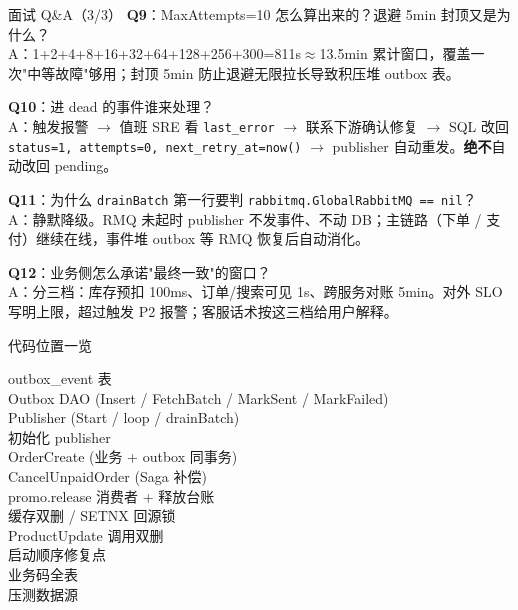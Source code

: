 \documentclass[aspectratio=169,11pt]{beamer}
\begin{document}
\begin{frame}[shrink]{面试 Q\&A（3/3）}
\textbf{Q9}：MaxAttempts=10 怎么算出来的？退避 5min 封顶又是为什么？\\
\hspace{4mm}\small A：1+2+4+8+16+32+64+128+256+300=811s$\approx$13.5min 累计窗口，覆盖一次"中等故障"够用；封顶 5min 防止退避无限拉长导致积压堆 outbox 表。

\vspace{2mm}
\textbf{Q10}：进 dead 的事件谁来处理？\\
\hspace{4mm}\small A：触发报警 $\to$ 值班 SRE 看 \texttt{last\_error} $\to$ 联系下游确认修复 $\to$ SQL 改回 \texttt{status=1, attempts=0, next\_retry\_at=now()} $\to$ publisher 自动重发。\textbf{绝不}自动改回 pending。

\vspace{2mm}
\textbf{Q11}：为什么 \texttt{drainBatch} 第一行要判 \texttt{rabbitmq.GlobalRabbitMQ == nil}？\\
\hspace{4mm}\small A：静默降级。RMQ 未起时 publisher 不发事件、不动 DB；主链路（下单 / 支付）继续在线，事件堆 outbox 等 RMQ 恢复后自动消化。

\vspace{2mm}
\textbf{Q12}：业务侧怎么承诺"最终一致"的窗口？\\
\hspace{4mm}\small A：分三档：库存预扣 100ms、订单/搜索可见 1s、跨服务对账 5min。对外 SLO 写明上限，超过触发 P2 报警；客服话术按这三档给用户解释。
\end{frame}

\begin{frame}[shrink]{代码位置一览}
\begin{description}
  \item[outbox\_event 表]
  \item[Outbox DAO (Insert / FetchBatch / MarkSent / MarkFailed)]
  \item[Publisher (Start / loop / drainBatch)]
  \item[初始化 publisher]
  \item[OrderCreate (业务 + outbox 同事务)]
  \item[CancelUnpaidOrder (Saga 补偿)]
  \item[promo.release 消费者 + 释放台账]
  \item[缓存双删 / SETNX 回源锁]
  \item[ProductUpdate 调用双删]
  \item[启动顺序修复点]
  \item[业务码全表]
  \item[压测数据源]
\end{description}
\end{frame}
\end{document}
